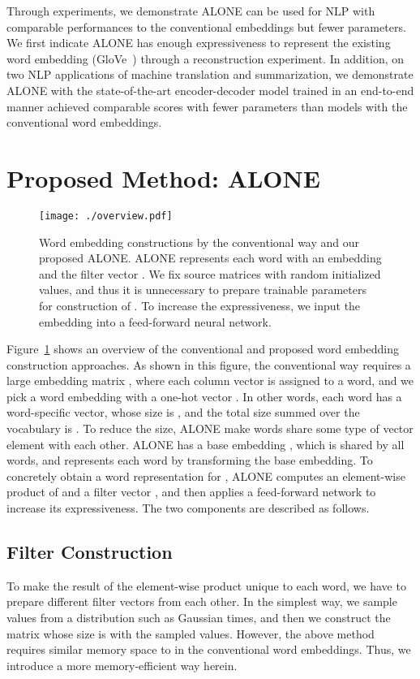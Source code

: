 \documentclass{article}
\begin{document}
Through experiments, we demonstrate ALONE can be used for NLP with comparable performances to the conventional embeddings but fewer parameters.
We first indicate ALONE has enough expressiveness to represent the existing word embedding (GloVe~\cite{pennington2014glove}) through a reconstruction experiment.
In addition, on two NLP applications of machine translation and summarization,
we demonstrate ALONE with the state-of-the-art encoder-decoder model trained in an end-to-end manner achieved comparable scores with fewer parameters than models with the conventional word embeddings.


\section{Proposed Method: ALONE}
\begin{figure}[!t]
  \centering
  \texttt{[image: ./overview.pdf]}
   \caption{Word embedding constructions by the conventional way and our proposed ALONE. ALONE represents each word with an embedding  and the filter vector . We fix source matrices with random initialized values, and thus it is unnecessary to prepare trainable parameters for construction of . To increase the expressiveness, we input the embedding into a feed-forward neural network.}
   \label{fig:overview}
\end{figure}


Figure~\ref{fig:overview} shows an overview of the conventional and proposed word embedding construction approaches.
As shown in this figure, the conventional way requires a large embedding matrix , where each column vector is assigned to a word, and we pick a word embedding with a one-hot vector .
In other words, each word has a word-specific vector, whose size is , and the total size summed over the vocabulary is .
To reduce the size, ALONE make words share some type of vector element with each other.
ALONE has a base embedding , which is shared by all words, and represents each word by transforming the base embedding.
To concretely obtain a word representation for , ALONE computes an element-wise product of  and a filter vector , and then applies a feed-forward network to increase its expressiveness.
The two components are described as follows.


\subsection{Filter Construction}\label{sec:mask_construction}
To make the result of the element-wise product  unique to each word, we have to prepare different filter vectors from each other.
In the simplest way, we sample values from a distribution such as Gaussian  times, and then we construct the matrix whose size is  with the sampled values.
However, the above method requires similar memory space to  in the conventional word embeddings.
Thus, we introduce a more memory-efficient way herein.
\end{document}
